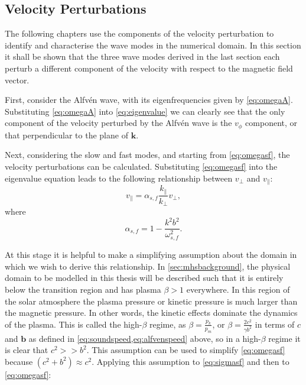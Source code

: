 \documentclass[a4paper,12pt,fourier,authoryear,custommargin]{Classes/PhDThesisPSnPDF}
\renewcommand{\vec}{\mathbf}
\begin{document}
\subsection{Velocity Perturbations}\label{sec:Vpert}

The following chapters use the components of the velocity perturbation to identify and characterise the wave modes in the numerical domain.
In this section it shall be shown that the three wave modes derived in the last section each perturb a different component of the velocity with respect to the magnetic field vector.

First, consider the Alfv\'en wave, with its eigenfrequencies given by \cref{eq:omegaA}.
Substituting \cref{eq:omegaA} into \cref{eq:eigenvalue} we can clearly see that the only component of the velocity perturbed by the Alfv\'en wave is the $v_\phi$ component, or that perpendicular to the plane of $\vec{k}$.

Next, considering the slow and fast modes, and starting from \cref{eq:omegasf}, the velocity perturbations can be calculated.
Substituting \cref{eq:omegasf} into the eigenvalue equation leads to the following relationship between $v_\perp$ and $v_\parallel$:
\begin{equation}
    v_\parallel = \alpha_{s,f} \frac{k_\parallel}{k_\perp}v_\perp,
    \label{eq:vyvz}
\end{equation}
where
\begin{equation}
    \alpha_{s,f} = 1 - \frac{k^2b^2}{\omega^2_{s,f}}.
    \label{eq:alphasf}
\end{equation}

At this stage it is helpful to make a simplifying assumption about the domain in which we wish to derive this relationship.
In \cref{sec:mhsbackground}, the physical domain to be modelled in this thesis will be described such that it is entirely below the transition region and has plasma $\beta > 1$ everywhere.
In this region of the solar atmosphere the plasma pressure or kinetic pressure is much larger than the magnetic pressure.
In other words, the kinetic effects dominate the dynamics of the plasma.
This is called the high-$\beta$ regime, as $\displaystyle\beta = \frac{p_k}{p_m}$, or $\displaystyle\beta = \frac{2c^2}{\gamma b^2}$ in terms of $c$ and $\vec{b}$ as defined in \cref{eq:soundspeed,eq:alfvenspeed} above, so in a high-$\beta$ regime it is clear that $c^2 >> b^2$.
This assumption can be used to simplify \cref{eq:omegasf} because $(c^2 + b^2) \approx c^2$.
Applying this assumption to \cref{eq:sigmasf} and then to \cref{eq:omegasf}:
\end{document}
